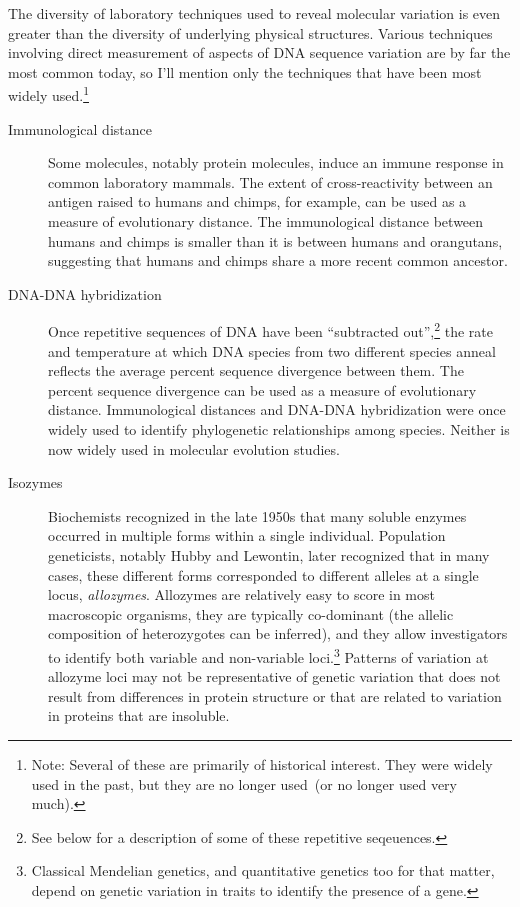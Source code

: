 \documentclass[12pt]{article}
\begin{document}
The diversity of laboratory techniques used to reveal molecular
variation is even greater than the diversity of underlying physical
structures. Various techniques involving direct measurement of aspects
of DNA sequence variation are by far the most common today, so I'll
mention only the techniques that have been most widely
used.\footnote{Note: Several of these are primarily of historical
  interest. They were widely used in the past, but they are no longer
  used~(or no longer used very much).}

\begin{description}

\item[Immunological distance] Some molecules, notably protein
  molecules, induce an immune response in common laboratory
  mammals. The extent of cross-reactivity between an antigen raised to
  humans and chimps, for example, can be used as a measure of
  evolutionary distance. The immunological distance between humans and
  chimps is smaller than it is between humans and orangutans,
  suggesting that humans and chimps share a more recent common
  ancestor.

\item[DNA-DNA hybridization] Once repetitive sequences of DNA have
  been ``subtracted out'',\footnote{See below for a description of
    some of these repetitive seqeuences.} the rate and temperature at
  which DNA species from two different species anneal reflects the
  average percent sequence divergence between them. The percent
  sequence divergence can be used as a measure of evolutionary
  distance. Immunological distances and DNA-DNA hybridization were
  once widely used to identify phylogenetic relationships among
  species. Neither is now widely used in molecular evolution
  studies.

\item[Isozymes] Biochemists recognized in the late 1950s that many
  soluble enzymes occurred in multiple forms within a single
  individual. Population geneticists, notably Hubby and Lewontin, later
  recognized that in many cases, these different forms corresponded to
  different alleles at a single locus, {\it allozymes}. Allozymes are
  relatively easy to score in most macroscopic organisms, they are
  typically co-dominant (the allelic composition of heterozygotes can
  be inferred), and they allow investigators to identify both variable
  and non-variable loci.\footnote{Classical Mendelian genetics, and
    quantitative genetics too for that matter, depend on genetic
    variation in traits to identify the presence of a gene.} Patterns
  of variation at allozyme loci may not be representative of genetic
  variation that does not result from differences in protein structure
  or that are related to variation in proteins that are
  insoluble.


\end{description}
\end{document}
